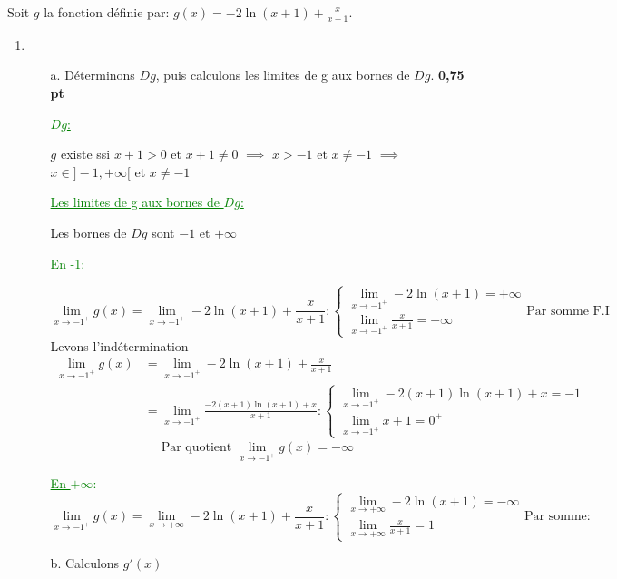 \documentclass[12pt]{article}
\begin{document}
Soit $g$ la fonction définie par: $g(x)=-2\ln(x+1)+\frac{x}{x+1}.$
\begin{enumerate}
\item 
\begin{enumerate}
\item[a.] Déterminons $Dg$, puis calculons les limites de g aux bornes de $Dg$. \textbf{0,75 pt}

\textcolor{green}{\underline{$Dg$:}}

$g$ existe ssi $ x+1 >0 $ et $x+1\neq 0$ $\implies$ $ x>-1 $ et $x\neq -1$ $\implies$ $x\in]-1,+\infty[$ et $x\neq -1$ 
		\begin{center}
			\textcolor{green}{\boxed{Df=]-1,+\infty[}}
		\end{center}
\textcolor{green}{\underline{Les limites de g aux bornes de $Dg$:}}

Les bornes de $Dg$ sont $-1$ et $+\infty$

\textcolor{green}{\underline{En -1}:}

\[
\lim_{x \to -1^{+}}g(x)=\lim_{x \to -1^{+}}-2\ln(x+1)+\frac{x}{x+1}:
\begin{cases}
\lim_{x \to -1^{+}}-2\ln(x+1)=+\infty\\
\lim_{x \to -1^{+}}\frac{x}{x+1}=-\infty
\end{cases}
\text{Par somme F.I}
\]
Levons l'indétermination
\begin{align*}
\lim_{x \to -1^{+}}g(x)&=\lim_{x \to -1^{+}}-2\ln(x+1)+\frac{x}{x+1}\\
&=\lim_{x \to -1^{+}}\frac{-2(x+1)\ln(x+1)+x}{x+1}:
\begin{cases}
\lim_{x \to -1^{+}}-2(x+1)\ln(x+1)+x=-1\\
\lim_{x \to -1^{+}}x+1=0^{+}
\end{cases}
\end{align*}
\[\text{Par quotient }\lim_{x \to -1^{+}}g(x)=-\infty\]
		\begin{center}
			\textcolor{green}{}
		\end{center}		
\textcolor{green}{\underline{En $+\infty$}:}
\[
\lim_{x \to -1^{+}}g(x)=\lim_{x \to +\infty}-2\ln(x+1)+\frac{x}{x+1}:
\begin{cases}
\lim_{x \to +\infty}-2\ln(x+1)=-\infty\\
\lim_{x \to +\infty}\frac{x}{x+1}=1
\end{cases}
\text{Par somme:}
\]
		\begin{center}
			\textcolor{green}{}
		\end{center}
\item[b.] Calculons $g'(x)$ 


\end{enumerate}
\end{enumerate}
\end{document}
